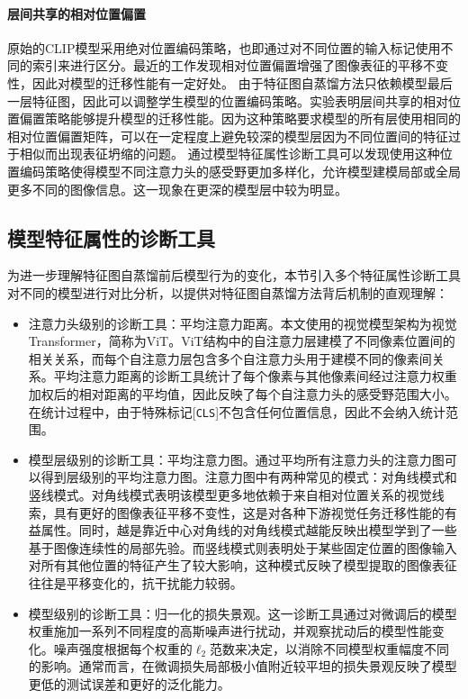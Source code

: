 \paragraph{层间共享的相对位置偏置} 原始的CLIP模型采用绝对位置编码策略，也即通过对不同位置的输入标记使用不同的索引来进行区分。最近的工作\cite{Swin,li2022mvitv2}发现相对位置偏置增强了图像表征的平移不变性，因此对模型的迁移性能有一定好处。
由于特征图自蒸馏方法只依赖模型最后一层特征图，因此可以调整学生模型的位置编码策略。实验表明层间共享的相对位置偏置策略\cite{bao2021beit}能够提升模型的迁移性能。因为这种策略要求模型的所有层使用相同的相对位置偏置矩阵，可以在一定程度上避免较深的模型层因为不同位置间的特征过于相似而出现表征坍缩的问题\cite{xie2023revealing}。%
通过模型特征属性诊断工具可以发现使用这种位置编码策略使得模型不同注意力头的感受野更加多样化，允许模型建模局部或全局更多不同的图像信息。这一现象在更深的模型层中较为明显。%

\subsection{模型特征属性的诊断工具}
为进一步理解特征图自蒸馏前后模型行为的变化，本节引入多个特征属性诊断工具对不同的模型进行对比分析，以提供对特征图自蒸馏方法背后机制的直观理解：
\begin{itemize}
    \item 注意力头级别的诊断工具：平均注意力距离\cite{dosovitskiy2020vit,xie2023revealing}。本文使用的视觉模型架构为视觉Transformer，简称为ViT\cite{dosovitskiy2020vit}。ViT结构中的自注意力层建模了不同像素位置间的相关关系，而每个自注意力层包含多个自注意力头用于建模不同的像素间关系。平均注意力距离的诊断工具统计了每个像素与其他像素间经过注意力权重加权后的相对距离的平均值，因此反映了每个自注意力头的感受野范围大小。在统计过程中，由于特殊标记[\texttt{CLS}]不包含任何位置信息，因此不会纳入统计范围。
    \item 模型层级别的诊断工具：平均注意力图\cite{zhou2021deepvit}。通过平均所有注意力头的注意力图可以得到层级别的平均注意力图。注意力图中有两种常见的模式：对角线模式和竖线模式。对角线模式表明该模型更多地依赖于来自相对位置关系的视觉线索，具有更好的图像表征平移不变性，这是对各种下游视觉任务迁移性能的有益属性。同时，越是靠近中心对角线的对角线模式越能反映出模型学到了一些基于图像连续性的局部先验。而竖线模式则表明处于某些固定位置的图像输入对所有其他位置的特征产生了较大影响，这种模式反映了模型提取的图像表征往往是平移变化的，抗干扰能力较弱。
    \item 模型级别的诊断工具：归一化的损失景观\cite{li2018visualizing}。这一诊断工具通过对微调后的模型权重施加一系列不同程度的高斯噪声进行扰动，并观察扰动后的模型性能变化。噪声强度根据每个权重的$\ell_2$范数来决定，以消除不同模型权重幅度不同的影响。通常而言，在微调损失局部极小值附近较平坦的损失景观反映了模型更低的测试误差和更好的泛化能力。
\end{itemize}

